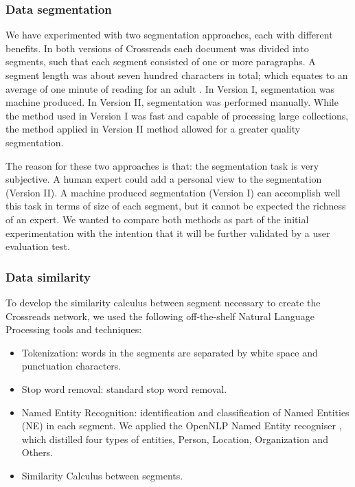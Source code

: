 \documentclass{acm_proc_article-sp}
\begin{document}
\subsubsection{Data segmentation}

We have experimented with two segmentation approaches, each with 
different benefits.
In both versions of Crossreads each document was divided into segments, such that each segment consisted of one or more paragraphs. A segment length was about seven hundred characters in total; which equates to an average of one minute of reading for an adult \cite{williams1998guidelines}. 
In Version I, segmentation was machine produced. In Version II, segmentation was performed manually.
While the method used in Version I was fast and capable of processing  large collections, the method applied in Version II method allowed for a greater quality segmentation.

The reason for these two approaches is that: the segmentation task is very subjective. A human expert could add a personal view to the segmentation (Version II). A machine produced  segmentation (Version I) can accomplish well this task in terms of size of each segment, but it cannot be expected the richness of an expert. We wanted to compare both methods as part of the initial experimentation with the intention that it will be further validated by a user evaluation test.

\subsubsection{Data similarity}

To develop the similarity calculus between segment necessary to create the Crossreads network, we used the following off-the-shelf Natural Language Processing tools and techniques:

\begin{itemize}
\item Tokenization: words in the segments are separated by white space and punctuation characters. 
\item Stop word removal: standard stop word removal. 
\item Named Entity Recognition: identification and classification of Named Entities (NE) in each segment. We applied the OpenNLP Named Entity recogniser \cite{baldridge2005opennlp}, which distilled four types of entities, Person, Location, Organization and Others.
\item Similarity Calculus between segments.
\end{itemize}
\end{document}
